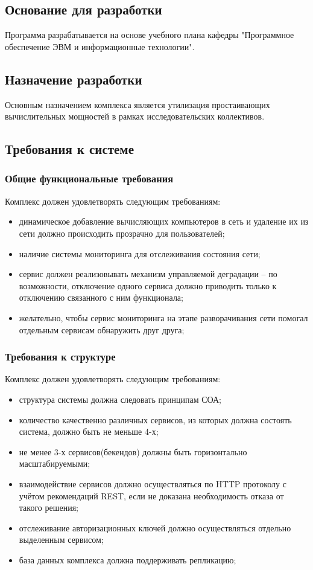 \documentclass[a4paper,12pt]{report}
\numberwithin{equation}{section}
\begin{document}
\subsection{Основание для разработки}
Программа разрабатывается на основе учебного плана кафедры "Программное обеспечение ЭВМ и информационные технологии".

\subsection{Назначение разработки}
Основным назначением комплекса является утилизация простаивающих вычислительных мощностей в рамках исследовательских коллективов.

\subsection{Требования к системе}
\subsubsection{Общие функциональные требования}
Комплекс должен удовлетворять следующим требованиям:

\begin{itemize}
  \item динамическое добавление вычисляющих компьютеров в сеть и удаление их из сети должно происходить прозрачно для пользователей;
  \item наличие системы мониторинга для отслеживания состояния сети;
  \item сервис должен реализовывать механизм управляемой деградации -- по возможности, отключение одного сервиса должно приводить только к отключению связанного с ним функционала;
  \item желательно, чтобы сервис мониторинга на этапе разворачивания сети помогал отдельным сервисам обнаружить друг друга;
  
\end{itemize}

\subsubsection{Требования к структуре}
Комплекс должен удовлетворять следующим требованиям:
\begin{itemize}
  \item структура системы должна следовать принципам СОА;
  \item количество качественно различных сервисов, из которых должна состоять система, должно быть не меньше 4-х;
  \item не менее 3-х сервисов(бекендов) должны быть горизонтально масштабируемыми;
  \item взаимодействие сервисов должно осуществляться по HTTP протоколу с учётом рекомендаций REST, если не доказана необходимость отказа от такого решения;
  \item отслеживание авторизационных ключей должно осуществляться отдельно выделенным сервисом;
  \item база данных комплекса должна поддерживать репликацию; 
\end{itemize}
\end{document}
